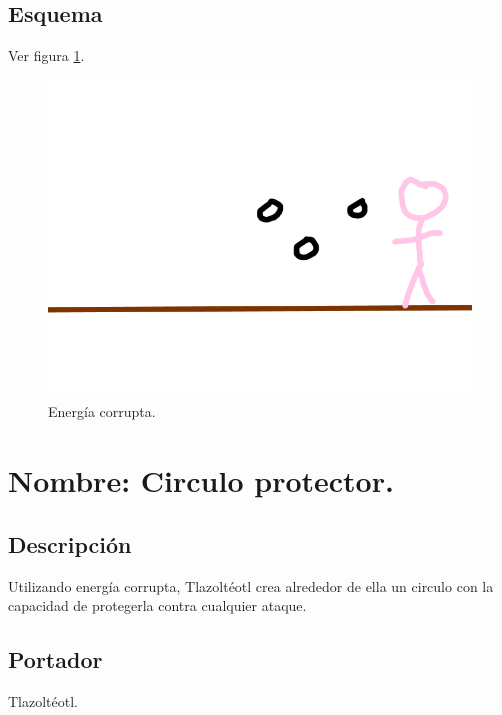 \subsection{Esquema}
			Ver figura \ref{fig:energiaC}.
			\begin{figure}
				\centering
				\includegraphics[height=0.2 \textheight]{Imagenes/energiaC}
				\caption{Energía corrupta.}
				\label{fig:energiaC}
			\end{figure}	

\section{Nombre: Circulo protector.} \label{hab.CirPro}
\subsection{Descripción}
Utilizando energía corrupta,  Tlazoltéotl crea alrededor de ella un circulo con la capacidad de protegerla contra cualquier ataque.
\subsection{Portador}
Tlazoltéotl.
